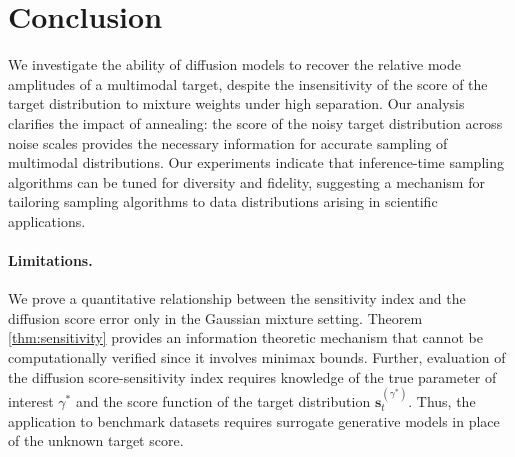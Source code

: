 \documentclass[11pt]{article}
\newcommand{\vect}[1]{\mathbf{#1}}
\theoremstyle{plain}
\newcommand{\1}{\mathbbm{1}}
\newcommand{\score}[2][]{\vect{s}_{#1}^{(#2)}}
\begin{document}
\section{Conclusion}

We investigate the ability of 
diffusion models to recover the relative mode amplitudes of a multimodal target, despite the insensitivity of the score of the target distribution to mixture weights under high separation. 
Our analysis clarifies the impact of annealing: the score of the noisy target distribution across noise scales provides the necessary information for accurate sampling of multimodal distributions. Our experiments indicate that inference-time sampling algorithms can be tuned for diversity and fidelity, suggesting a mechanism for tailoring
sampling algorithms to data distributions arising in scientific applications. 

 
\paragraph{Limitations.} We prove a quantitative relationship between the sensitivity index and the diffusion score error only in the Gaussian mixture setting. Theorem \ref{thm:sensitivity} provides an information theoretic mechanism that cannot be computationally verified since it involves minimax bounds. Further, evaluation of the diffusion score-sensitivity index requires knowledge of the true parameter of interest $\gamma^*$ and the score function of the target distribution $\score[t]{\gamma^*}$. Thus, the application to benchmark datasets requires surrogate generative models in place of the unknown target score.



\end{document}
